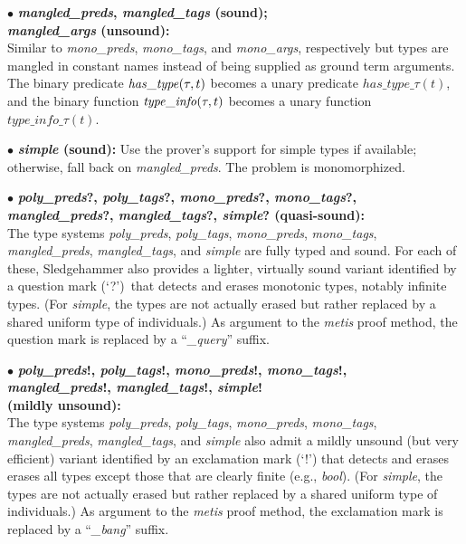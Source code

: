 \documentclass[a4paper,12pt]{article}
\begin{document}
\begin{enum}
\begin{enum}
\item[$\bullet$]
\textbf{%
\textit{mangled\_preds},
\textit{mangled\_tags} (sound); \\
\textit{mangled\_args} (unsound):} \\
Similar to
\textit{mono\_preds}, \textit{mono\_tags}, and \textit{mono\_args},
respectively but types are mangled in constant names instead of being supplied
as ground term arguments. The binary predicate $\mathit{has\_type\/}(\tau, t)$
becomes a unary predicate $\mathit{has\_type\_}\tau(t)$, and the binary function
$\mathit{type\_info\/}(\tau, t)$ becomes a unary function
$\mathit{type\_info\_}\tau(t)$.

\item[$\bullet$] \textbf{\textit{simple} (sound):} Use the prover's support for
simple types if available; otherwise, fall back on \textit{mangled\_preds}. The
problem is monomorphized.

\item[$\bullet$]
\textbf{%
\textit{poly\_preds}?, \textit{poly\_tags}?, \textit{mono\_preds}?, \textit{mono\_tags}?, \\
\textit{mangled\_preds}?, \textit{mangled\_tags}?, \textit{simple}? (quasi-sound):} \\
The type systems \textit{poly\_preds}, \textit{poly\_tags},
\textit{mono\_preds}, \textit{mono\_tags}, \textit{mangled\_preds},
\textit{mangled\_tags}, and \textit{simple} are fully typed and sound. For each
of these, Sledgehammer also provides a lighter, virtually sound variant
identified by a question mark (`{?}')\ that detects and erases monotonic types,
notably infinite types. (For \textit{simple}, the types are not actually erased
but rather replaced by a shared uniform type of individuals.) As argument to the
\textit{metis} proof method, the question mark is replaced by a
``\textit{\_query}'' suffix.

\item[$\bullet$]
\textbf{%
\textit{poly\_preds}!, \textit{poly\_tags}!, \textit{mono\_preds}!, \textit{mono\_tags}!, \\
\textit{mangled\_preds}!, \textit{mangled\_tags}!, \textit{simple}! \\
(mildly unsound):} \\
The type systems \textit{poly\_preds}, \textit{poly\_tags},
\textit{mono\_preds}, \textit{mono\_tags}, \textit{mangled\_preds},
\textit{mangled\_tags}, and \textit{simple} also admit a mildly unsound (but
very efficient) variant identified by an exclamation mark (`{!}') that detects
and erases erases all types except those that are clearly finite (e.g.,
\textit{bool}). (For \textit{simple}, the types are not actually erased but
rather replaced by a shared uniform type of individuals.) As argument to the
\textit{metis} proof method, the exclamation mark is replaced by a
``\textit{\_bang}'' suffix.


\end{enum}
\end{enum}
\end{document}
